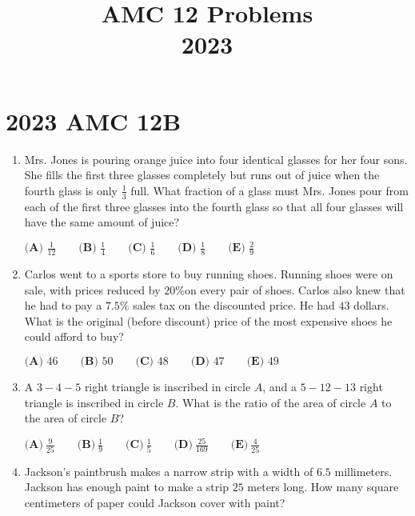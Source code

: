 \documentclass{article}
\title{AMC 12 Problems \\ 2023}
\date{}
\begin{document}
\maketitle\thispagestyle{fancy}\newpage\section*{2023 AMC 12B}\begin{enumerate}[label=\arabic*., itemsep=0.5em]\item Mrs. Jones is pouring orange juice into four identical glasses for her four sons. She fills the first three glasses completely but runs out of juice when the fourth glass is only \(\frac{1}{3}\) full. What fraction of a glass must Mrs. Jones pour from each of the first three glasses into the fourth glass so that all four glasses will have the same amount of juice?

\(\textbf{(A) }\frac{1}{12}\qquad\textbf{(B) }\frac{1}{4}\qquad\textbf{(C) }\frac{1}{6}\qquad\textbf{(D) }\frac{1}{8}\qquad\textbf{(E) }\frac{2}{9}\)\par \vspace{0.5em}\item Carlos went to a sports store to buy running shoes. Running shoes were on sale, with prices reduced by \(20\%\)on every pair of shoes. Carlos also knew that he had to pay a \(7.5\%\) sales tax on the discounted price. He had \(43\) dollars. What is the original (before discount) price of the most expensive shoes he could afford to buy?

\(\textbf{(A) }46\qquad\textbf{(B) }50\qquad\textbf{(C) }48\qquad\textbf{(D) }47\qquad\textbf{(E) }49\)\par \vspace{0.5em}\item A \(3-4-5\) right triangle is inscribed in circle \(A\), and a \(5-12-13\) right triangle is inscribed in circle \(B\). What is the ratio of the area of circle \(A\) to the area of circle \(B\)?

\(\textbf{(A)}~\frac{9}{25}\qquad\textbf{(B)}~\frac{1}{9}\qquad\textbf{(C)}~\frac{1}{5}\qquad\textbf{(D)}~\frac{25}{169}\qquad\textbf{(E)}~\frac{4}{25}\)\par \vspace{0.5em}\item Jackson's paintbrush makes a narrow strip with a width of \(6.5\) millimeters. Jackson has enough paint to make a strip \(25\) meters long. How many square centimeters of paper could Jackson cover with paint?


\end{enumerate}
\end{document}
